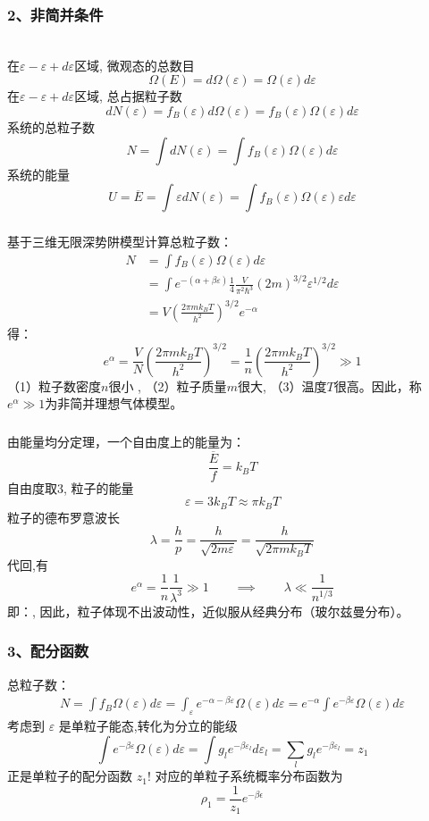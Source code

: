\begin{frame}
  \frametitle{ 2、非简并条件}
  \emf[几个重要的计算公式：] 
  ~~\\ 
  在$\varepsilon - \varepsilon + d \varepsilon $区域, 微观态的总数目
  \[ \Omega(E) = d\Omega(\varepsilon) = \Omega(\varepsilon) d \varepsilon \]
  在$\varepsilon - \varepsilon + d \varepsilon $区域, 总占据粒子数
  \[ d N(\varepsilon) = f_{B}(\varepsilon) d\Omega(\varepsilon) = f_{B}(\varepsilon) \Omega(\varepsilon) d \varepsilon \]
  系统的总粒子数
  \[ N = \int d N(\varepsilon) = \int f_{B}(\varepsilon) \Omega(\varepsilon) d \varepsilon\]
  系统的能量
  \[ U= \overline{E} = \int \varepsilon d N(\varepsilon) = \int f_{B}(\varepsilon) \Omega(\varepsilon) \varepsilon d \varepsilon\]
\end{frame} 

\begin{frame}
  \frametitle{}
  基于三维无限深势阱模型计算总粒子数：
  \[ \begin{aligned}
    N &= \int f_{B}(\varepsilon) \Omega(\varepsilon) d \varepsilon \\ 
    &= \int e^{-(\alpha +\beta \varepsilon)} \frac{1}{4} \frac{V}{\pi ^2 \hbar^3} (2m)^{3/2} \varepsilon^{1/2} d \varepsilon \\
    &= V \left( \frac{2 \pi m k_B T}{h^2} \right)^{3/2} e^{-\alpha}
  \end{aligned}\]
  得：
  \[ e^{\alpha} = \frac{V}{N} \left( \frac{2 \pi m k_B T}{h^2} \right)^{3/2} = 
  \frac{1}{n} \left( \frac{2 \pi m k_B T}{h^2} \right)^{3/2}  \gg 1\]
  \emf[非简并条件：]（1）粒子数密度$n$很小 , （2）粒子质量$m$很大, （3）温度$T$很高。因此，称$e^{\alpha}\gg 1 $为非简并理想气体模型。

\end{frame} 

\begin{frame}
  \frametitle{}
由能量均分定理，一个自由度上的能量为：
\[  \frac{\overline{E}}{f} = k_B T \]
自由度取3, 粒子的能量
\[ \varepsilon = 3 k_B T \approx \pi k_B T\]
粒子的德布罗意波长
\[ \lambda = \frac{h}{p} = \frac{h}{\sqrt{2m\varepsilon } } = \frac{h}{\sqrt{2 \pi m k_B T} } \]
代回,有
\[ e^{\alpha} = \frac{1}{n} \frac{1}{\lambda ^3} \gg 1 \qquad \implies \qquad \lambda \ll \frac{1}{n^{1/3}}\]
即： , 因此，粒子体现不出波动性，近似服从经典分布（玻尔兹曼分布）。
\end{frame} 

\begin{frame}
  \frametitle{ 3、配分函数}
  总粒子数：
  \[ \begin{aligned}
    N = \int f_{B} \Omega(\varepsilon) d \varepsilon  
    = \int_{\varepsilon} e^{-\alpha -\beta \varepsilon} \Omega(\varepsilon) d \varepsilon 
    = e^{-\alpha} \int e^{-\beta \varepsilon} \Omega(\varepsilon) d \varepsilon 
  \end{aligned}\]
  考虑到 $\varepsilon$ 是单粒子能态,转化为分立的能级
  \[ \int e^{-\beta \varepsilon} \Omega(\varepsilon) d \varepsilon 
  = \int g_l e^{-\beta \varepsilon _l }  d \varepsilon_l 
  = \sum_l  g_l e^{-\beta \varepsilon _l } = z_1
  \]
  正是单粒子的配分函数 $z_1$! 对应的单粒子系统概率分布函数为
  \[ \rho _1 = \frac{1}{z_1} e ^ {-\beta \epsilon} \]
\end{frame} 

